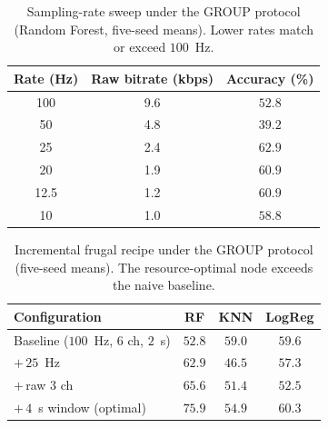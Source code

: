 \begin{table}[t]
\centering
\caption{Sampling-rate sweep under the GROUP protocol (Random Forest, five-seed means). Lower rates match or exceed $100$~Hz.}
\label{tab:sampling}
\renewcommand{\arraystretch}{1.2}
\begin{tabular}{@{}ccc@{}}
\toprule
\textbf{Rate (Hz)} & \textbf{Raw bitrate (kbps)} & \textbf{Accuracy (\%)} \\
\midrule
100  & 9.6 & $52.8$ \\
50   & 4.8 & $39.2$ \\
25   & 2.4 & $\mathbf{62.9}$ \\
20   & 1.9 & $60.9$ \\
12.5 & 1.2 & $60.9$ \\
10   & 1.0 & $58.8$ \\
\bottomrule
\end{tabular}
\end{table}

\begin{table}[t]
\centering
\caption{Incremental frugal recipe under the GROUP protocol
(five-seed means). The resource-optimal node exceeds the naive
baseline.}
\label{tab:recipe}
\renewcommand{\arraystretch}{1.2}
\begin{tabular}{@{}lccc@{}}
\toprule
\textbf{Configuration} & \textbf{RF} & \textbf{KNN} & \textbf{LogReg} \\
\midrule
Baseline ($100$~Hz, $6$ ch, $2$~s) & $52.8$ & $59.0$ & $59.6$ \\
\;$+\,25$~Hz                        & $62.9$ & $46.5$ & $57.3$ \\
\;$+\,$raw $3$ ch                   & $65.6$ & $51.4$ & $52.5$ \\
\;$+\,4$~s window (optimal)         & $\mathbf{75.9}$ & $54.9$ & $60.3$ \\
\bottomrule
\end{tabular}
\end{table}

